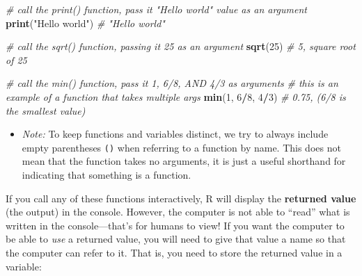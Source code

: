 \documentclass[]{book}
\newenvironment{Shaded}{\begin{snugshade}}{\end{snugshade}}
\newcommand{\KeywordTok}[1]{\textcolor[rgb]{0.13,0.29,0.53}{\textbf{#1}}}
\newcommand{\DecValTok}[1]{\textcolor[rgb]{0.00,0.00,0.81}{#1}}
\newcommand{\StringTok}[1]{\textcolor[rgb]{0.31,0.60,0.02}{#1}}
\newcommand{\CommentTok}[1]{\textcolor[rgb]{0.56,0.35,0.01}{\textit{#1}}}
\newcommand{\OperatorTok}[1]{\textcolor[rgb]{0.81,0.36,0.00}{\textbf{#1}}}
\newcommand{\NormalTok}[1]{#1}
\providecommand{\tightlist}{%
  \setlength{\itemsep}{0pt}\setlength{\parskip}{0pt}}
\theoremstyle{definition}
\theoremstyle{definition}
\theoremstyle{remark}
\begin{document}
\begin{Shaded}
\begin{Highlighting}[]
\CommentTok{# call the print() function, pass it "Hello world" value as an argument}
\KeywordTok{print}\NormalTok{(}\StringTok{"Hello world"}\NormalTok{)  }\CommentTok{# "Hello world"}

\CommentTok{# call the sqrt() function, passing it 25 as an argument}
\KeywordTok{sqrt}\NormalTok{(}\DecValTok{25}\NormalTok{)  }\CommentTok{# 5, square root of 25}

\CommentTok{# call the min() function, pass it 1, 6/8, AND 4/3 as arguments}
\CommentTok{# this is an example of a function that takes multiple args}
\KeywordTok{min}\NormalTok{(}\DecValTok{1}\NormalTok{, }\DecValTok{6}\OperatorTok{/}\DecValTok{8}\NormalTok{, }\DecValTok{4}\OperatorTok{/}\DecValTok{3}\NormalTok{)  }\CommentTok{# 0.75, (6/8 is the smallest value)}
\end{Highlighting}
\end{Shaded}

\begin{itemize}
\tightlist
\item
  \emph{Note:} To keep functions and variables distinct, we try to
  always include empty parentheses \texttt{()} when referring to a
  function by name. This does not mean that the function takes no
  arguments, it is just a useful shorthand for indicating that something
  is a function.
\end{itemize}

If you call any of these functions interactively, R will display the
\textbf{returned value} (the output) in the console. However, the
computer is not able to ``read'' what is written in the console---that's
for humans to view! If you want the computer to be able to \emph{use} a
returned value, you will need to give that value a name so that the
computer can refer to it. That is, you need to store the returned value
in a variable:
\end{document}
